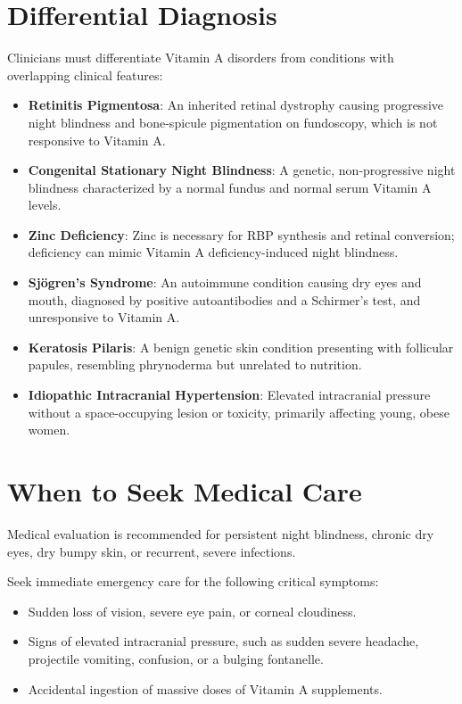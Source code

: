 \section*{Differential Diagnosis}
Clinicians must differentiate Vitamin A disorders from conditions with overlapping clinical features:
\begin{itemize}
    \item \textbf{Retinitis Pigmentosa}: An inherited retinal dystrophy causing progressive night blindness and bone-spicule pigmentation on fundoscopy, which is not responsive to Vitamin A.
    \item \textbf{Congenital Stationary Night Blindness}: A genetic, non-progressive night blindness characterized by a normal fundus and normal serum Vitamin A levels.
    \item \textbf{Zinc Deficiency}: Zinc is necessary for RBP synthesis and retinal conversion; deficiency can mimic Vitamin A deficiency-induced night blindness.
    \item \textbf{Sj\"{o}gren's Syndrome}: An autoimmune condition causing dry eyes and mouth, diagnosed by positive autoantibodies and a Schirmer's test, and unresponsive to Vitamin A.
    \item \textbf{Keratosis Pilaris}: A benign genetic skin condition presenting with follicular papules, resembling phrynoderma but unrelated to nutrition.
    \item \textbf{Idiopathic Intracranial Hypertension}: Elevated intracranial pressure without a space-occupying lesion or toxicity, primarily affecting young, obese women.
\end{itemize}

\section*{When to Seek Medical Care}
Medical evaluation is recommended for persistent night blindness, chronic dry eyes, dry bumpy skin, or recurrent, severe infections.

Seek immediate emergency care for the following critical symptoms:
\begin{itemize}
    \item Sudden loss of vision, severe eye pain, or corneal cloudiness.
    \item Signs of elevated intracranial pressure, such as sudden severe headache, projectile vomiting, confusion, or a bulging fontanelle.
    \item Accidental ingestion of massive doses of Vitamin A supplements.
\end{itemize}

